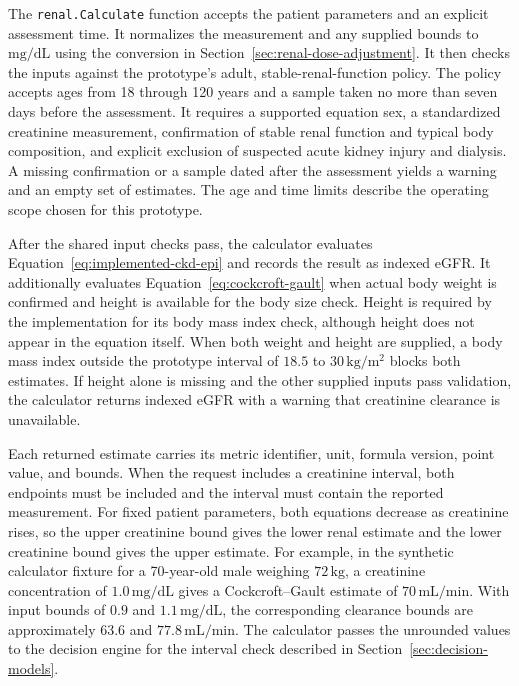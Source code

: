\documentclass[12pt,a4paper,twoside]{book}
\begin{document}
The \texttt{renal.Calculate} function accepts the patient parameters and an explicit assessment time.
It normalizes the measurement and any supplied bounds to \(\mathrm{mg/dL}\) using the conversion in Section~\ref{sec:renal-dose-adjustment}.
It then checks the inputs against the prototype's adult, stable-renal-function policy.
The policy accepts ages from 18 through 120 years and a sample taken no more than seven days before the assessment.
It requires a supported equation sex, a standardized creatinine measurement, confirmation of stable renal function and typical body composition, and explicit exclusion of suspected acute kidney injury and dialysis.
A missing confirmation or a sample dated after the assessment yields a warning and an empty set of estimates.
The age and time limits describe the operating scope chosen for this prototype.

After the shared input checks pass, the calculator evaluates Equation~\eqref{eq:implemented-ckd-epi} and records the result as indexed eGFR.
It additionally evaluates Equation~\eqref{eq:cockcroft-gault} when actual body weight is confirmed and height is available for the body size check.
Height is required by the implementation for its body mass index check, although height does not appear in the equation itself.
When both weight and height are supplied, a body mass index outside the prototype interval of \(18.5\) to \(30\,\mathrm{kg/m^2}\) blocks both estimates.
If height alone is missing and the other supplied inputs pass validation, the calculator returns indexed eGFR with a warning that creatinine clearance is unavailable.

Each returned estimate carries its metric identifier, unit, formula version, point value, and bounds.
When the request includes a creatinine interval, both endpoints must be included and the interval must contain the reported measurement.
For fixed patient parameters, both equations decrease as creatinine rises, so the upper creatinine bound gives the lower renal estimate and the lower creatinine bound gives the upper estimate.
For example, in the synthetic calculator fixture for a 70-year-old male weighing \(72\,\mathrm{kg}\), a creatinine concentration of \(1.0\,\mathrm{mg/dL}\) gives a Cockcroft--Gault estimate of \(70\,\mathrm{mL/min}\).
With input bounds of \(0.9\) and \(1.1\,\mathrm{mg/dL}\), the corresponding clearance bounds are approximately \(63.6\) and \(77.8\,\mathrm{mL/min}\).
The calculator passes the unrounded values to the decision engine for the interval check described in Section~\ref{sec:decision-models}.
\end{document}
